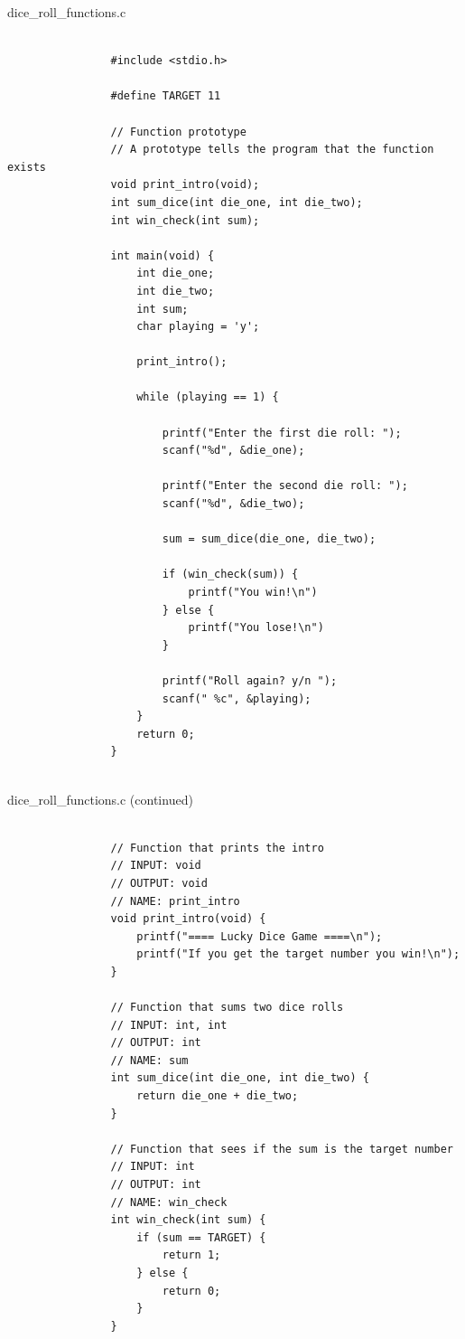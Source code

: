 \documentclass{article}
\begin{document}
		\begin{question}{dice\_roll\_functions.c}
			\begin{verbatim}
				
				#include <stdio.h>

				#define TARGET 11

				// Function prototype
				// A prototype tells the program that the function exists
				void print_intro(void);		
				int sum_dice(int die_one, int die_two);
				int win_check(int sum);

				int main(void) {
					int die_one;
					int die_two;
					int sum;
					char playing = 'y';

					print_intro();

					while (playing == 1) {

						printf("Enter the first die roll: ");
						scanf("%d", &die_one);

						printf("Enter the second die roll: ");
						scanf("%d", &die_two);

						sum = sum_dice(die_one, die_two);

						if (win_check(sum)) {
							printf("You win!\n")
						} else {
							printf("You lose!\n")
						}

						printf("Roll again? y/n ");
						scanf(" %c", &playing);
					}
					return 0;
				}


			\end{verbatim}

		\end{question}
		\begin{question}{dice\_roll\_functions.c (continued)}
			\begin{verbatim}

				// Function that prints the intro
				// INPUT: void
				// OUTPUT: void
				// NAME: print_intro
				void print_intro(void) {
					printf("==== Lucky Dice Game ====\n");
					printf("If you get the target number you win!\n");
				}
				
				// Function that sums two dice rolls
				// INPUT: int, int
				// OUTPUT: int
				// NAME: sum
				int sum_dice(int die_one, int die_two) {
					return die_one + die_two;
				}

				// Function that sees if the sum is the target number
				// INPUT: int
				// OUTPUT: int
				// NAME: win_check
				int win_check(int sum) {
					if (sum == TARGET) {
						return 1;
					} else {
						return 0;
					}
				}
				
			\end{verbatim}
			
		\end{question}
\end{document}
